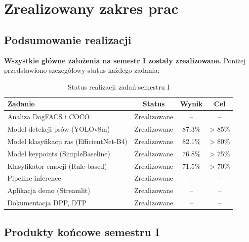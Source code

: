 \documentclass[12pt,a4paper]{article}
\begin{document}
\section{Zrealizowany zakres prac}

\subsection{Podsumowanie realizacji}

\textbf{Wszystkie główne założenia na semestr I zostały zrealizowane.} Poniżej przedstawiono szczegółowy status każdego zadania:

\begin{table}[h]
\centering
\begin{tabular}{p{6cm}ccc}
\toprule
\textbf{Zadanie} & \textbf{Status} & \textbf{Wynik} & \textbf{Cel} \\
\midrule
Analiza DogFACS i COCO & \textcolor{green!60!black}{Zrealizowane} & -- & -- \\
Model detekcji psów (YOLOv8m) & \textcolor{green!60!black}{Zrealizowane} & 87.3\% & > 85\% \\
Model klasyfikacji ras (EfficientNet-B4) & \textcolor{green!60!black}{Zrealizowane} & 82.1\% & > 80\% \\
Model keypoints (SimpleBaseline) & \textcolor{green!60!black}{Zrealizowane} & 76.8\% & > 75\% \\
Klasyfikator emocji (Rule-based) & \textcolor{green!60!black}{Zrealizowane} & 71.5\% & > 70\% \\
Pipeline inference & \textcolor{green!60!black}{Zrealizowane} & -- & -- \\
Aplikacja demo (Streamlit) & \textcolor{green!60!black}{Zrealizowane} & -- & -- \\
Dokumentacja DPP, DTP & \textcolor{green!60!black}{Zrealizowane} & -- & -- \\
\bottomrule
\end{tabular}
\caption{Status realizacji zadań semestru I}
\end{table}

\subsection{Produkty końcowe semestru I}
\end{document}
